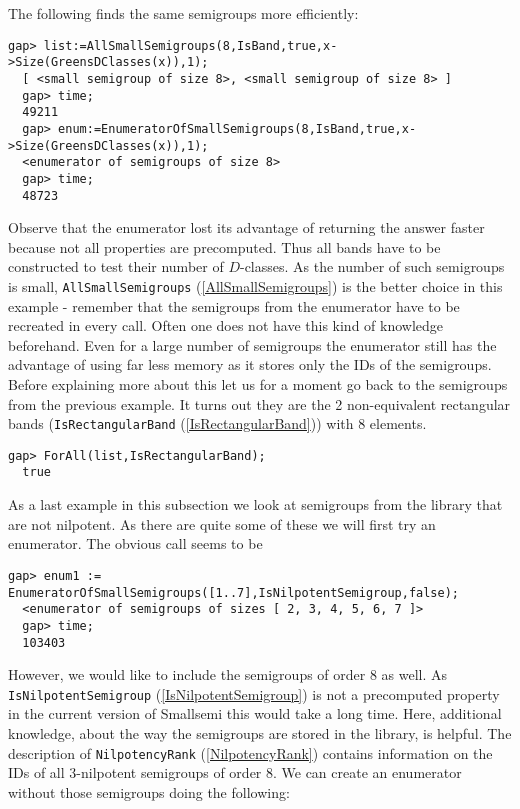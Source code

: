 \documentclass[a4paper,11pt]{report}
\begin{document}
{{{ The following finds the same semigroups more efficiently: 
\begin{Verbatim}[fontsize=\small,frame=single,label=Example]
  gap> list:=AllSmallSemigroups(8,IsBand,true,x->Size(GreensDClasses(x)),1);
  [ <small semigroup of size 8>, <small semigroup of size 8> ]
  gap> time;
  49211
  gap> enum:=EnumeratorOfSmallSemigroups(8,IsBand,true,x->Size(GreensDClasses(x)),1);
  <enumerator of semigroups of size 8>
  gap> time;
  48723
\end{Verbatim}
 Observe that the enumerator lost its advantage of returning the answer faster
because not all properties are precomputed. Thus all bands have to be
constructed to test their number of $D$-classes. As the number of such semigroups is small, \texttt{AllSmallSemigroups} (\ref{AllSmallSemigroups}) is the better choice in this example - remember that the semigroups from the
enumerator have to be recreated in every call. Often one does not have this
kind of knowledge beforehand. Even for a large number of semigroups the
enumerator still has the advantage of using far less memory as it stores only
the IDs of the semigroups. Before explaining more about this let us for a
moment go back to the semigroups from the previous example. It turns out they
are the 2 non-equivalent rectangular bands (\texttt{IsRectangularBand} (\ref{IsRectangularBand})) with 8 elements. 
\begin{Verbatim}[fontsize=\small,frame=single,label=Example]
  gap> ForAll(list,IsRectangularBand);
  true
\end{Verbatim}
  As a last example in this subsection we look at semigroups from the library
that are not nilpotent. As there are quite some of these we will first try an
enumerator. The obvious call seems to be 
\begin{Verbatim}[fontsize=\small,frame=single,label=Example]
  gap> enum1 := EnumeratorOfSmallSemigroups([1..7],IsNilpotentSemigroup,false);
  <enumerator of semigroups of sizes [ 2, 3, 4, 5, 6, 7 ]>
  gap> time;
  103403
\end{Verbatim}
 However, we would like to include the semigroups of order 8 as well. As \texttt{IsNilpotentSemigroup} (\ref{IsNilpotentSemigroup}) is not a precomputed property in the current version of \textsf{Smallsemi} this would take a long time. Here, additional knowledge, about the way the
semigroups are stored in the library, is helpful. The description of \texttt{NilpotencyRank} (\ref{NilpotencyRank}) contains information on the IDs of all 3-nilpotent semigroups of order 8. We
can create an enumerator without those semigroups doing the following: 
}}}
\end{document}
